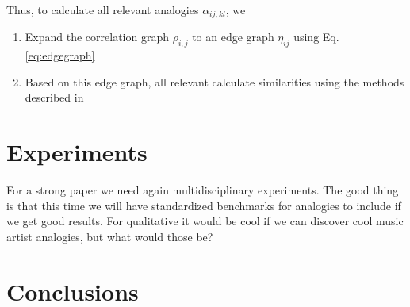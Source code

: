 \documentclass{article} %
\newcommand{\comment}[1]{{\small \color{red} {#1}} \normalcolor}
\newcommand{\rn}[1]{\rho_{#1}}
\newcommand{\egr}[1]{\eta_{#1}}
\begin{document}
Thus, to calculate all relevant analogies $\alpha_{ij,kl}$, we
\begin{enumerate}
	\item{Expand the correlation graph $\rn{i,j}$ to an edge graph $\egr{ij}$ using Eq. \ref{eq:edgegraph}}
	\item{Based on this edge graph, all relevant calculate similarities using the methods described in \cite{gornerup2015similarity}}
\end{enumerate}

\section{Experiments}

\comment{For a strong paper we need again multidisciplinary experiments. The good thing is that this time
	we will have standardized benchmarks for analogies to include if we get good results. For 
	qualitative it would be cool if we can discover cool music artist analogies, but what would those be?}

\section{Conclusions}



\end{document}
